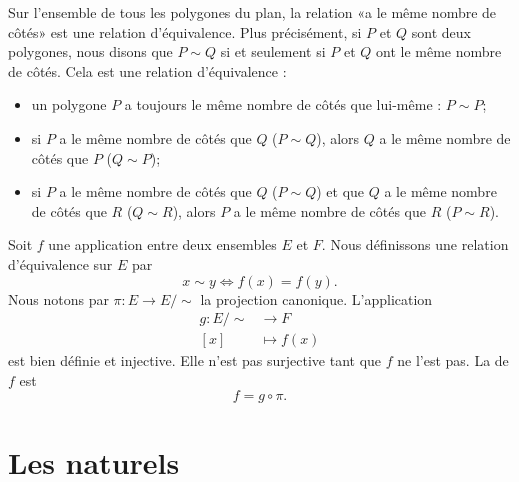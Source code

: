 \begin{example}
    Sur l'ensemble de tous les polygones du plan, la relation «a le même nombre de côtés» est une relation d'équivalence. Plus précisément, si $P$ et $Q$ sont deux polygones, nous disons que $P\sim Q$ si et seulement si $P$ et $Q$ ont le même nombre de côtés. Cela est une relation d'équivalence :
    \begin{itemize}
        \item
            un polygone $P$ a toujours le même nombre de côtés que lui-même : $P\sim P$;
        \item
            si $P$ a le même nombre de côtés que $Q$ ($P\sim Q$), alors $Q$ a le même nombre de côtés que $P$ ($Q\sim P$);
        \item
            si $P$ a le même nombre de côtés que $Q$ ($P\sim Q$) et que $Q$ a le même nombre de côtés que $R$ ($Q\sim R$), alors $P$ a le même nombre de côtés que $R$ ($P\sim R$).
    \end{itemize}
\end{example}

\begin{example}
Soit \( f\) une application entre deux ensembles \( E\) et \( F\). Nous définissons une relation d'équivalence sur \( E\) par
\begin{equation}
    x\sim y\Leftrightarrow f(x)=f(y).
\end{equation}
Nous notons par \( \pi\colon E\to E/\sim\) la projection canonique. L'application
\begin{equation}
    \begin{aligned}
        g\colon E/\sim&\to F \\
        [x]&\mapsto f(x)
    \end{aligned}
\end{equation}
est bien définie et injective. Elle n'est pas surjective tant que \( f\) ne l'est pas. La  de \( f\) est
\begin{equation}
    f=g\circ\pi.
\end{equation}
\end{example}

\section{Les naturels}
\label{SECooPJSYooNYaIaq}

